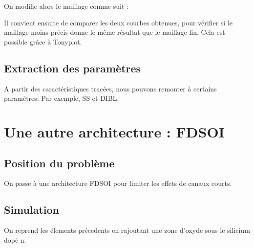 \documentclass[a4paper,11pt]{report}
\begin{document}
On modifie alors le maillage comme suit :
\vspace{0.3cm}

\noindent{}
\vspace{0.3cm}

Il convient ensuite de comparer les deux courbes obtenues, pour vérifier si le maillage moins précis donne le même résultat que le maillage fin. Cela est possible grâce à Tonyplot.



\section{Extraction des paramètres}
A partir des caractéristiques tracées, nous pouvons remonter à certains paramètres. Par exemple, SS et DIBL.




\chapter{Une autre architecture : FDSOI}

\section{Position du problème}

On passe à une architecture FDSOI pour limiter les effets de canaux courts.


\section{Simulation}
On reprend les élements précedents en rajoutant une zone d'oxyde sous le silicium dopé n.
\end{document}
